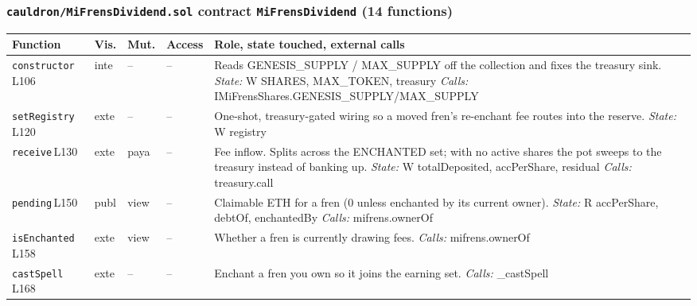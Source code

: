 \subsubsection*{\texttt{cauldron/MiFrensDividend.sol} \textemdash{} contract \texttt{MiFrensDividend} \hfill \normalfont\small(14 functions)}
\begin{longtable}{@{}>{\raggedright\arraybackslash}p{}p{}p{}p{}>{\raggedright\arraybackslash}p{}@{}}
\toprule \textbf{Function} & \textbf{Vis.} & \textbf{Mut.} & \textbf{Access} & \textbf{Role, state touched, external calls} \\ \midrule \endhead
\texttt{constructor}\,{\tiny L106} & inte & -- & -- & Reads GENESIS\_SUPPLY / MAX\_SUPPLY off the collection and fixes the treasury sink. \newline \textit{State:} W SHARES,\allowbreak{} MAX\_TOKEN,\allowbreak{} treasury \newline \textit{Calls:} IMiFrensShares.\allowbreak{}GENESIS\_SUPPLY/\allowbreak{}MAX\_SUPPLY \\
\texttt{set\allowbreak{}Registry}\,{\tiny L120} & exte & -- & -- & One-shot, treasury-gated wiring so a moved fren's re-enchant fee routes into the reserve. \newline \textit{State:} W registry \\
\texttt{receive}\,{\tiny L130} & exte & paya & -- & Fee inflow. Splits across the ENCHANTED set; with no active shares the pot sweeps to the treasury instead of banking up. \newline \textit{State:} W totalDeposited,\allowbreak{} accPerShare,\allowbreak{} residual \newline \textit{Calls:} treasury.\allowbreak{}call \\
\texttt{pending}\,{\tiny L150} & publ & view & -- & Claimable ETH for a fren (0 unless enchanted by its current owner). \newline \textit{State:} R accPerShare,\allowbreak{} debtOf,\allowbreak{} enchantedBy \newline \textit{Calls:} mifrens.\allowbreak{}ownerOf \\
\texttt{is\allowbreak{}Enchanted}\,{\tiny L158} & exte & view & -- & Whether a fren is currently drawing fees. \newline \textit{Calls:} mifrens.\allowbreak{}ownerOf \\
\texttt{cast\allowbreak{}Spell}\,{\tiny L168} & exte & -- & -- & Enchant a fren you own so it joins the earning set. \newline \textit{Calls:} \_castSpell \\

\end{longtable}
